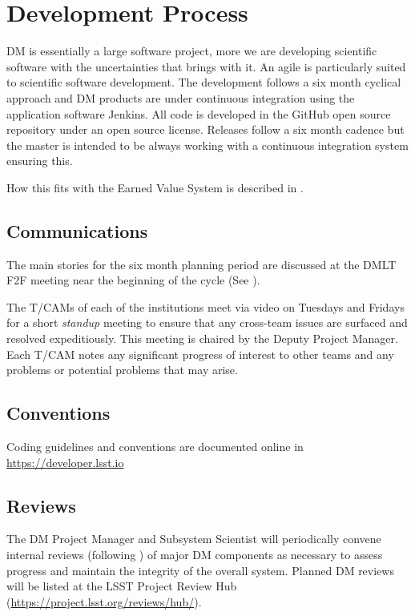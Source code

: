 \section{Development Process} \label{sect:devproc}

DM is essentially a large software project, more we are developing scientific software with the uncertainties that brings with it.
An agile \citep{it:agile} is particularly suited to scientific software development.  The development follows a six month  cyclical approach and  DM  products are under continuous
integration using the application software Jenkins. All code is developed in the GitHub open source repository under an open source license.
Releases follow a six month cadence but the master is intended to be always working with a continuous integration system ensuring this.

How this fits with the Earned Value System is described in .


\subsection{Communications}

The main stories for the six month planning period are discussed at the DMLT F2F meeting near the beginning of the cycle (See ).

The T/CAMs of each of the institutions meet via video on Tuesdays and Fridays for a short \emph{standup} meeting to ensure that any cross-team issues are surfaced and resolved expeditiously.
This meeting is chaired by the Deputy Project Manager.
Each T/CAM notes any significant progress of interest to other teams and any problems or potential problems that may arise.

\subsection{Conventions}
Coding guidelines and conventions are documented online in \url{https://developer.lsst.io}

\subsection{Reviews} \label{sect:reviews}

The DM Project Manager and Subsystem Scientist will periodically convene internal reviews (following )
of major DM components as necessary to assess progress and maintain the integrity of the overall system. Planned DM reviews will be listed at the LSST Project Review Hub (\url{https://project.lsst.org/reviews/hub/}).

